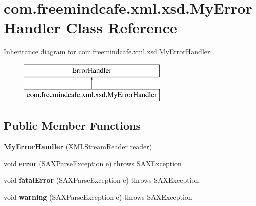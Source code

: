 \hypertarget{classcom_1_1freemindcafe_1_1xml_1_1xsd_1_1_my_error_handler}{}\section{com.\+freemindcafe.\+xml.\+xsd.\+My\+Error\+Handler Class Reference}
\label{classcom_1_1freemindcafe_1_1xml_1_1xsd_1_1_my_error_handler}
Inheritance diagram for com.\+freemindcafe.\+xml.\+xsd.\+My\+Error\+Handler\+:\begin{figure}[H]
\begin{center}
\leavevmode
\includegraphics[height=2.000000cm]{classcom_1_1freemindcafe_1_1xml_1_1xsd_1_1_my_error_handler}
\end{center}
\end{figure}
\subsection*{Public Member Functions}
\begin{DoxyCompactItemize}
\item 
\hypertarget{classcom_1_1freemindcafe_1_1xml_1_1xsd_1_1_my_error_handler_a0e8ecbb396473b222a7a366a29b60228}{}{\bfseries My\+Error\+Handler} (X\+M\+L\+Stream\+Reader reader)\label{classcom_1_1freemindcafe_1_1xml_1_1xsd_1_1_my_error_handler_a0e8ecbb396473b222a7a366a29b60228}

\item 
\hypertarget{classcom_1_1freemindcafe_1_1xml_1_1xsd_1_1_my_error_handler_ab3928b9490d0cacee82dd0ad4558ca3f}{}void {\bfseries error} (S\+A\+X\+Parse\+Exception e)  throws S\+A\+X\+Exception \label{classcom_1_1freemindcafe_1_1xml_1_1xsd_1_1_my_error_handler_ab3928b9490d0cacee82dd0ad4558ca3f}

\item 
\hypertarget{classcom_1_1freemindcafe_1_1xml_1_1xsd_1_1_my_error_handler_a4c344fca080e3c6c5181fffad7ed3ee2}{}void {\bfseries fatal\+Error} (S\+A\+X\+Parse\+Exception e)  throws S\+A\+X\+Exception \label{classcom_1_1freemindcafe_1_1xml_1_1xsd_1_1_my_error_handler_a4c344fca080e3c6c5181fffad7ed3ee2}

\item 
\hypertarget{classcom_1_1freemindcafe_1_1xml_1_1xsd_1_1_my_error_handler_aaf199fbc1974b846f0a858ff11c42e6b}{}void {\bfseries warning} (S\+A\+X\+Parse\+Exception e)  throws S\+A\+X\+Exception \label{classcom_1_1freemindcafe_1_1xml_1_1xsd_1_1_my_error_handler_aaf199fbc1974b846f0a858ff11c42e6b}

\end{DoxyCompactItemize}


